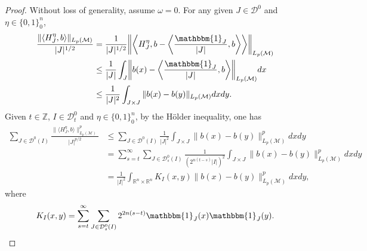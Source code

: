 \documentclass[oneside,english,a4wide]{amsart}
\numberwithin{equation}{section}
\numberwithin{figure}{section}
\theoremstyle{plain}
\theoremstyle{plain}
\theoremstyle{definition}
\theoremstyle{plain}
\theoremstyle{remark}
\theoremstyle{definition}
\theoremstyle{remark}
\theoremstyle{definition}
\newcommand{\8}{\infty}
\begin{document}
\begin{proof}
	Without loss of generality, assume $\omega=0$. For any given $J\in\mathcal{D}^0$ and $\eta\in\{0,1\}^n_0$,
	\begin{equation*}
		\begin{aligned}
			\frac{\|\langle H_J^\eta,b\rangle\|_{L_p(\mathcal{M})}}{|J|^{1/2}}
			{}&=\frac{1}{|J|^{1/2}}\bigg\|\biggl\langle H_J^\eta,b-\biggl\langle \frac{\mathbbm{1}_{J}}{|J|},b\biggr\rangle\biggr\rangle\bigg\|_{L_p(\mathcal{M})}\\
			&\le \frac{1}{|J|}\int_J\biggl\|b(x)-\biggl\langle \frac{\mathbbm{1}_J}{|J|},b\biggr\rangle\biggr\|_{L_p(\mathcal{M})} dx\\
			&\le \frac{1}{|J|^2}\int_{J\times J}\|b(x)-b(y)\|_{L_p(\mathcal{M})}dxdy.
		\end{aligned}
	\end{equation*}
	Given $t\in\mathbb{Z}$, $I\in \mathcal{D}^0_t$ and $\eta\in\{0,1\}^n_0$, by the H\"{o}lder inequality, one has
	\begin{equation*}
		\begin{aligned}
			\sum_{J\in\mathcal{D}^0(I)}\frac{\|\langle H_J^\eta,b\rangle\|_{L_p(\mathcal{M})}^p}{|J|^{p/2}}{}&\le  \sum_{J\in\mathcal{D}^0(I)} \frac{1}{|J|^2}\int_{J\times J}\|b(x)-b(y)\|_{L_p(\mathcal{M})}^pdxdy\\
			&=\sum_{s=t}^\infty\sum_{J\in\mathcal{D}^0_s(I)}\frac{1}{(2^{n(t-s)}|I|)^2}\int_{J\times J}\|b(x)-b(y)\|_{L_p(\mathcal{M})}^pdxdy\\
			&=\frac{1}{|I|^2}\int_{\mathbb{R}^n\times\mathbb{R}^n}K_I(x,y)\|b(x)-b(y)\|_{L_p(\mathcal{M})}^pdxdy,
		\end{aligned}
	\end{equation*}
	where
	\begin{equation*}
		K_I(x,y)=\sum_{s=t}^\infty\sum_{J\in\mathcal{D}^0_s(I)}2^{2n(s-t)}\mathbbm{1}_J(x)\mathbbm{1}_J(y).

\end{equation*}
\end{proof}
\end{document}
